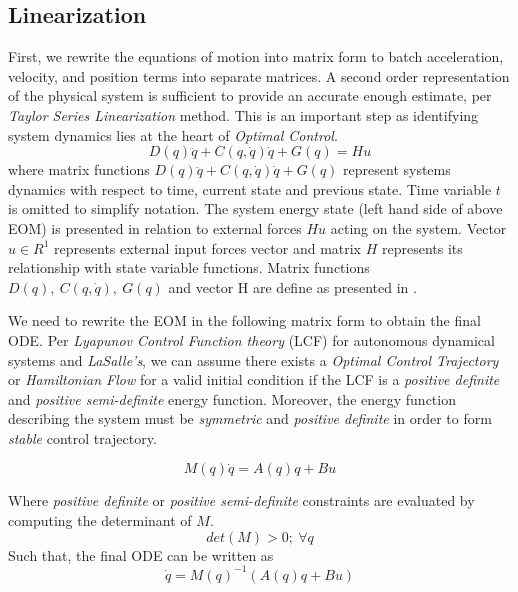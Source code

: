\documentclass[journal]{IEEEtran}
\begin{document}
\subsection{Linearization}
First, we rewrite the equations of motion into matrix form to batch acceleration,
velocity, and position terms into separate matrices. A second order representation
of the physical system is sufficient to provide an accurate enough estimate,
per \emph{Taylor Series Linearization} method. This is an important step as
identifying system dynamics lies at the heart of \emph{Optimal Control}.
\begin{equation}
D(q) \ddot{q} + C(q, \dot{q}) \dot{q} + G(q) = Hu
\end{equation}
where matrix functions \(D(q) \ddot{q} + C(q, \dot{q}) \dot{q} + G(q)\)
represent systems dynamics with respect to time,
current state and previous state. Time variable \(t\) is omitted to simplify
notation. The system energy state (left hand side of
above EOM) is presented in relation to external forces \(Hu\) acting on the
system. Vector \(u \in R^1\) represents external input forces vector and matrix
\(H\) represents its relationship with state variable functions. Matrix
functions \(D(q),~C(q, \dot{q}),~G(q)\) and vector H are define as presented in
\cite{optimalLQR}.

We need to rewrite the EOM in the following
matrix form to obtain the final ODE. Per \emph{Lyapunov
Control Function theory} (LCF) for autonomous dynamical systems and
\emph{LaSalle's}, we can assume there exists a
\emph{Optimal Control Trajectory} or \emph{Hamiltonian Flow} for a valid
initial condition if the LCF is a \emph{positive definite} and \emph{positive
semi-definite} energy function.
Moreover, the energy function describing the system must be \emph{symmetric} and \emph{positive definite} in order to form \emph{stable} control trajectory.

\begin{equation}
M(q)\dot{q} = A(q)q + Bu
\end{equation}

Where \emph{positive definite} or \emph{positive semi-definite} constraints are
evaluated by computing the determinant of \(M\).
\begin{equation}
det(M) > 0;~ \forall q
\end{equation}
Such that, the final ODE can be written as
\begin{equation}
    \dot{q} = M(q)^{-1}(A(q)q + Bu)
\end{equation}
\end{document}
